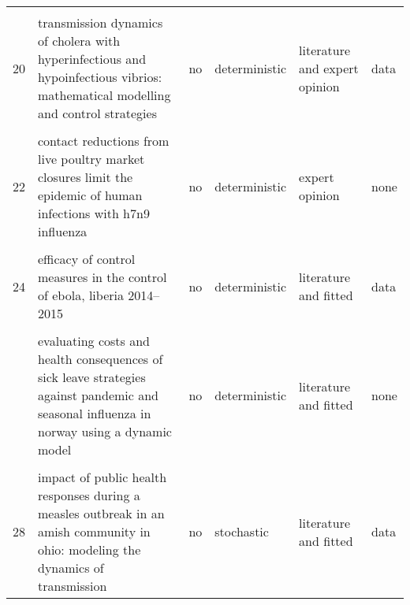 \documentclass[
]{article}
\begin{document}
\begin{landscape}
\begin{longtable}{l>{\raggedright\arraybackslash}p{3cm}l>{\raggedright\arraybackslash}p{3cm}ll}
\cellcolor{gray!6}{19} & \cellcolor{gray!6}{study on modeling simulation and optimal control method for the transmission risk of the ebola virus} & \cellcolor{gray!6}{no} & \cellcolor{gray!6}{deterministic} & \cellcolor{gray!6}{literature} & \cellcolor{gray!6}{none}\\
20 & transmission dynamics of cholera with hyperinfectious and hypoinfectious vibrios: mathematical modelling and control strategies & no & deterministic & literature and expert opinion & data\\
\addlinespace
\cellcolor{gray!6}{21} & \cellcolor{gray!6}{a new epidemics–logistics model: insights into controlling the ebola virus disease in west africa} & \cellcolor{gray!6}{yes} & \cellcolor{gray!6}{deterministic} & \cellcolor{gray!6}{literature and expert opinion and fitted} & \cellcolor{gray!6}{data}\\
22 & contact reductions from live poultry market closures limit the epidemic of human infections with h7n9 influenza & no & deterministic & expert opinion & none\\
\cellcolor{gray!6}{23} & \cellcolor{gray!6}{disparities in spread and control of influenza in slums of delhi: findings from an agent-based modelling study} & \cellcolor{gray!6}{yes} & \cellcolor{gray!6}{stochastic} & \cellcolor{gray!6}{literature and expert opinion} & \cellcolor{gray!6}{none}\\
24 & efficacy of control measures in the control of ebola, liberia 2014–2015 & no & deterministic & literature and fitted & data\\
\cellcolor{gray!6}{25} & \cellcolor{gray!6}{epidemiology of the silent polio outbreak in rahat, israel, based on modeling of environmental surveillance data} & \cellcolor{gray!6}{no} & \cellcolor{gray!6}{stochastic} & \cellcolor{gray!6}{fitted} & \cellcolor{gray!6}{none}\\
\addlinespace
26 & evaluating costs and health consequences of sick leave strategies against pandemic and seasonal influenza in norway using a dynamic model & no & deterministic & literature and fitted & none\\
\cellcolor{gray!6}{27} & \cellcolor{gray!6}{evaluating vaccination strategies to control foot-and-mouth disease: a country comparison study} & \cellcolor{gray!6}{yes} & \cellcolor{gray!6}{stochastic} & \cellcolor{gray!6}{literature and expert opinion} & \cellcolor{gray!6}{another model}\\
28 & impact of public health responses during a measles outbreak in an amish community in ohio: modeling the dynamics of transmission & no & stochastic & literature and fitted & data\\

\end{longtable}
\end{landscape}
\end{document}

